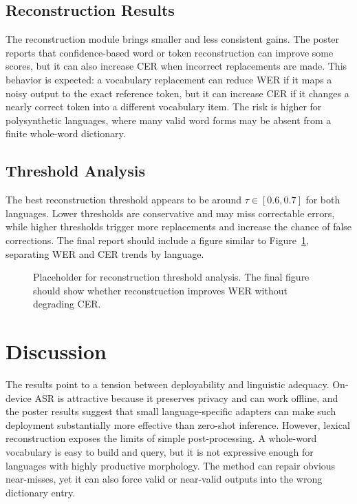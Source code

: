 \documentclass[11pt]{article}
\begin{document}
\subsection{Reconstruction Results}

The reconstruction module brings smaller and less consistent gains. The poster reports that confidence-based word or token reconstruction can improve some scores, but it can also increase CER when incorrect replacements are made. This behavior is expected: a vocabulary replacement can reduce WER if it maps a noisy output to the exact reference token, but it can increase CER if it changes a nearly correct token into a different vocabulary item. The risk is higher for polysynthetic languages, where many valid word forms may be absent from a finite whole-word dictionary.

\subsection{Threshold Analysis}

The best reconstruction threshold appears to be around $\tau \in [0.6, 0.7]$ for both languages. Lower thresholds are conservative and may miss correctable errors, while higher thresholds trigger more replacements and increase the chance of false corrections. The final report should include a figure similar to Figure~\ref{fig:threshold-placeholder}, separating WER and CER trends by language.

\begin{figure}[t]
\centering
{}
\caption{Placeholder for reconstruction threshold analysis. The final figure should show whether reconstruction improves WER without degrading CER.}
\label{fig:threshold-placeholder}
\end{figure}

\section{Discussion}

The results point to a tension between deployability and linguistic adequacy. On-device ASR is attractive because it preserves privacy and can work offline, and the poster results suggest that small language-specific adapters can make such deployment substantially more effective than zero-shot inference. However, lexical reconstruction exposes the limits of simple post-processing. A whole-word vocabulary is easy to build and query, but it is not expressive enough for languages with highly productive morphology. The method can repair obvious near-misses, yet it can also force valid or near-valid outputs into the wrong dictionary entry.
\end{document}
